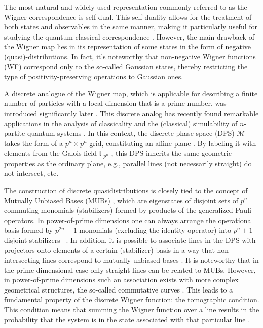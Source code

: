 \documentclass{article}
\begin{document}
The most natural and widely used representation
\cite{qoptics,electron1,electron2} commonly referred to as the Wigner
correspondence \cite{wigner} is self-dual. This self-duality allows for the
treatment of both states and observables in the same manner, making it
particularly useful for studying the quantum-classical correspondence \cite%
{berry}. However, the main drawback of the Wigner map lies in its
representation of some states in the form of negative (quasi)-distributions.
In fact, it's noteworthy that non-negative Wigner functions (WF) correspond
only to the so-called Gaussian states, thereby restricting the type of
positivity-preserving operations to Gaussian ones.

A discrete analogue of the Wigner map, which is applicable for describing a
finite number of particles with a local dimension that is a prime number,
was introduced significantly later \cite{spin1, spin2,wootters1,gibbons}.
This discrete analog has recently found remarkable applications in the
analysis of classicality and the (classical) simulability of $n$-partite
quantum systems \cite{gottKnill, galvao, cormick, gross,WignerNegResource,
Raus17, UniqueWF, cohomo}. In this context, the discrete phase-space (DPS) $%
\mathcal{M}$ takes the form of a $p^{n}\times p^{n}$ grid, constituting an
affine plane \cite{Saniga2004}. By labeling it with elements from the Galois
field $\mathbb{F}_{p^{n}}$ , this DPS inherits the same geometric properties as
the ordinary plane, e.g., parallel lines (not necessarily straight) do not
intersect, etc.

The construction of discrete quasidistributions is closely tied to the
concept of Mutually Unbiased Bases (MUBs) \cite{ivanovic,mubs1,mubs2}, which
are eigenstates of disjoint sets of $p^{n}$ commuting monomials
(stabilizers) formed by products of the generalized Pauli operators. In
power-of-prime dimensions one can always arrange the operational basis
formed by $p^{2n}-1$ monomials (excluding the identity operator) into $%
p^{n}+1$ disjoint stabilizers ~\cite{Bandyopadhyay2002}. In addition, it is
possible to associate lines in the DPS with projectors onto elements of a
certain (stabilizer) basis in a way that non-intersecting lines correspond
to mutually unbiased bases \cite{wootters1}. It is noteworthy that in the
prime-dimensional case only straight lines can be related to MUBs. However,
in power-of-prime dimensions such an association exists with more complex
geometrical structures, the so-called commutative curves \cite{GS2,JPA09}.
This leads to a fundamental property of the discrete Wigner function: the
tomographic condition. This condition means that summing the Wigner function
over a line results in the probability that the system is in the state
associated with that particular line \cite{wootters1, gibbons}.
\end{document}
